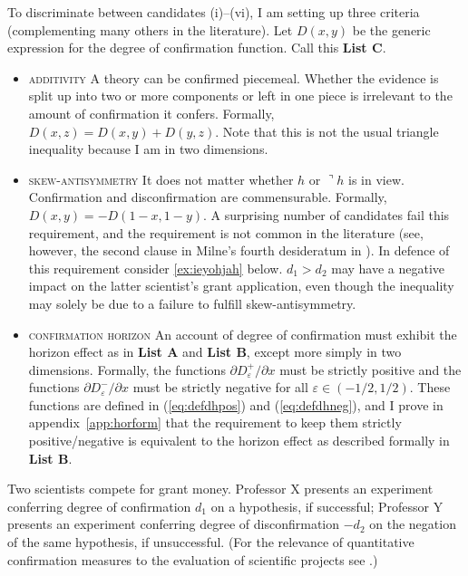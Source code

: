 \documentclass[11pt]{article}
\begin{document}
To discriminate between candidates (i)--(vi), I am setting up three
criteria (complementing many others in the literature). Let $D(x,y)$
be the generic expression for the degree of confirmation function.
Call this \textbf{List C}.

\begin{itemize}
\item \textsc{additivity} A theory can be confirmed piecemeal. Whether
  the evidence is split up into two or more components or left in one
  piece is irrelevant to the amount of confirmation it confers.
  Formally, $D(x,z)=D(x,y)+D(y,z)$. Note that this is not the usual
  triangle inequality because I am in two dimensions.
\item \textsc{skew-antisymmetry} It does not matter whether $h$ or
  $\urcorner{}h$ is in view. Confirmation and disconfirmation are
  commensurable. Formally, $D(x,y)=-D(1-x,1-y)$. A surprising number
  of candidates fail this requirement, and the requirement is not
  common in the literature (see, however, the second clause in Milne's
  fourth desideratum in ). In defence of this
  requirement consider {\xample} \ref{ex:ieyohjah} below.
  $d_{1}>{}d_{2}$ may have a negative impact on the latter scientist's
  grant application, even though the inequality may solely be due to a
  failure to fulfill skew-antisymmetry.
\item \textsc{confirmation horizon} An account of degree of
  confirmation must exhibit the horizon effect as in \textbf{List A}
  and \textbf{List B}, except more simply in two dimensions. Formally,
  the functions $\partial{}D_{\varepsilon}^{+}/\partial{}x$ must be
  strictly positive and the functions
  $\partial{}D_{\varepsilon}^{-}/\partial{}x$ must be strictly
  negative for all $\varepsilon\in{}(-1/2,1/2)$. These functions are
  defined in (\ref{eq:defdhpos}) and (\ref{eq:defdhneg}), and I prove
  in appendix~\ref{app:horform} that the requirement to keep them
  strictly positive/neg\-ative is equivalent to the horizon effect as
  described formally in \textbf{List B}.
\end{itemize}

\begin{quotex}
  \label{ex:ieyohjah} Two scientists
  compete for grant money. Professor X presents an experiment
  conferring degree of confirmation $d_{1}$ on a hypothesis, if
  successful; Professor Y presents an experiment conferring degree of
  disconfirmation $-d_{2}$ on the negation of the same hypothesis, if
  unsuccessful. (For the relevance of quantitative confirmation
  measures to the evaluation of scientific projects see
  .)
\end{quotex}
\end{document}
